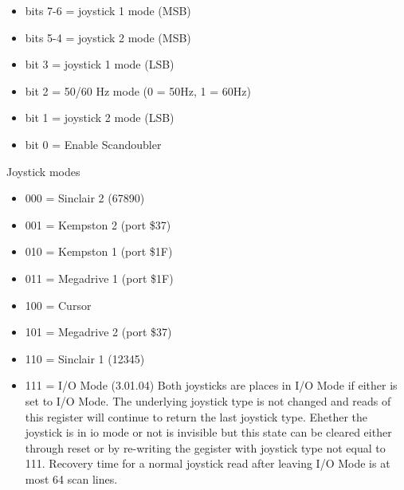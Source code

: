 \begin{itemize}
\item bits 7-6 = joystick 1 mode (MSB)
\item bits 5-4 = joystick 2 mode (MSB)
\item bit 3 = joystick 1 mode (LSB)
\item bit 2 = 50/60 Hz mode (0 = 50Hz, 1 = 60Hz)
\item bit 1 = joystick 2 mode (LSB)
\item bit 0 = Enable Scandoubler
\end{itemize}
Joystick modes
\begin{itemize}
\item 000 = Sinclair 2 (67890)
\item 001 = Kempston 2 (port \$37)
\item 010 = Kempston 1 (port \$1F)
\item 011 = Megadrive 1 (port \$1F)
\item 100 = Cursor
\item 101 = Megadrive 2 (port \$37)
\item 110 = Sinclair 1 (12345)
\item 111 = I/O Mode (3.01.04)
Both joysticks are places in I/O Mode if either is set to I/O
Mode. The underlying joystick type is not changed and reads of this
register will continue to return the last joystick type. Ehether the
joystick is in io mode or not is invisible but this state can be
cleared either through reset or by re-writing the gegister with
joystick type not equal to 111. Recovery time for a normal joystick
read after leaving I/O Mode is at most 64 scan lines.
\end{itemize}

